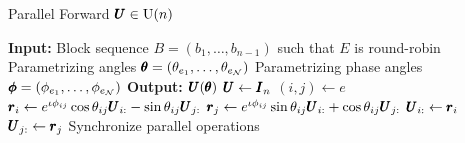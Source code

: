 \documentclass[superscriptaddress,floatfix]{article}
\begin{document}
\begin{appendices}
\begin{algorithm}[H]
  \caption{Parallel Forward ${\pmb{U}} \in \textrm{U}(n)$}
  \label{alg:GivensFwdRRUnitary}
  \begin{algorithmic}[0] %
    \State \textbf{Input:}
    \State \hspace*{\algorithmicindent} Block sequence $B = ( b_1,
    \ldots, b_{n-1})$ such that $E$ is round-robin
    \State \hspace*{\algorithmicindent} Parametrizing angles ${\pmb{\theta}} = (\theta_{e_1}, \ldots, \theta_{e_{\mathcal{N}}})$
    \State \hspace*{\algorithmicindent} Parametrizing phase angles ${\pmb{\phi}} = (\phi_{e_1}, \ldots, \phi_{e_{\mathcal{N}}})$
    \State \textbf{Output:}
    \State \hspace*{\algorithmicindent} ${\pmb{U}}({\pmb{\theta}})$
    \State ${\pmb{U}} \gets {\pmb{I}}_n$
       
        \State $(i,j) \gets e$
        \State ${\pmb{r}}_i \gets e^{\iota\phi_{ij}}\cos\theta_{ij}{\pmb{U}}_{i:} -
        \sin\theta_{ij}{\pmb{U}}_{j:}$
        \State ${\pmb{r}}_j \gets e^{\iota\phi_{ij}} \sin\theta_{ij}{\pmb{U}}_{i:} +
        \cos\theta_{ij}{\pmb{U}}_{j:}$
        \State ${\pmb{U}}_{i:} \gets {\pmb{r}}_i$
        \State ${\pmb{U}}_{j:} \gets {\pmb{r}}_j$
      \EndFor
      \State Synchronize parallel operations
    \EndFor
  \end{algorithmic}
\end{algorithm}


\end{appendices}
\end{document}
